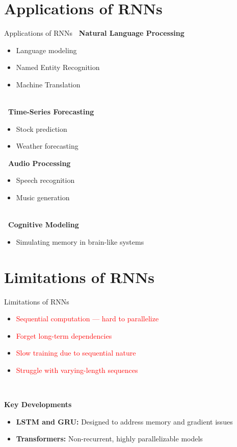 \section{Applications of RNNs}
\begin{frame}[allowframebreaks]{Applications of RNNs}
    \textbf{\faMobile\ Natural Language Processing}
    \begin{itemize}
        \item Language modeling
        \item Named Entity Recognition
        \item Machine Translation
    \end{itemize}
    \\[2em]
    \textbf{\faBarChart\ Time-Series Forecasting}
    \begin{itemize}
        \item Stock prediction
        \item Weather forecasting
    \end{itemize}

\framebreak

    \textbf{\faMusic\ Audio Processing}
    \begin{itemize}
        \item Speech recognition
        \item Music generation
    \end{itemize}
    \\[2em]
    \textbf{\faBrain\ Cognitive Modeling}
    \begin{itemize}
        \item Simulating memory in brain-like systems
    \end{itemize}
\end{frame}


\section{Limitations of RNNs}
\begin{frame}{Limitations of RNNs}
    \begin{itemize}
        \item \textcolor{red}{Sequential computation --- hard to parallelize}
        \item \textcolor{red}{Forget long-term dependencies}
        \item \textcolor{red}{Slow training due to sequential nature}
        \item \textcolor{red}{Struggle with varying-length sequences}
    \end{itemize}
    \\[2em]
    \begin{block}{\textbf{Key Developments}}
        \begin{itemize}
            \item \textbf{LSTM and GRU:} Designed to address memory and gradient issues
            \item \textbf{Transformers:} Non-recurrent, highly parallelizable models
        \end{itemize}
    \end{block}
\end{frame}

